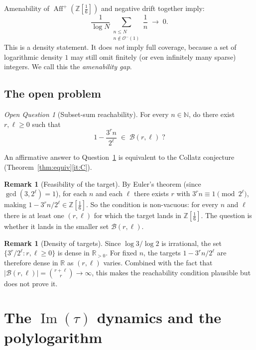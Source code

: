 \documentclass[12pt, a4paper]{amsart}
\theoremstyle{plain}
\theoremstyle{definition}
\newtheorem{remark}[theorem]{Remark}
\theoremstyle{remark}
\newtheorem{question}[theorem]{Open Question}
\newcommand{\N}{\mathbb{N}}
\newcommand{\Z}{\mathbb{Z}}
\newcommand{\R}{\mathbb{R}}
\newcommand{\Zs}{\Z[\tfrac{1}{6}]}
\newcommand{\Aff}{\operatorname{Aff}}
\begin{document}
Amenability of $\Aff^+(\Zs)$ and negative drift together imply:
\[
  \frac{1}{\log N}\sum_{\substack{n\leq N \\ n\notin\mathcal{O}^-(1)}}
  \frac{1}{n} \;\longrightarrow\; 0.
\]
This is a density statement.  It does \emph{not} imply full coverage,
because a set of logarithmic density $1$ may still omit finitely (or
even infinitely many sparse) integers.  We call this the
\emph{amenability gap}.

\subsection{The open problem}

\begin{question}[Subset-sum reachability]
  \label{q:reachability}
  For every $n\in\N$, do there exist $r,\ell\geq 0$ such that
  \[
    1 - \frac{3^r n}{2^\ell} \;\in\; \mathcal{B}(r,\ell)\;?
  \]
\end{question}

An affirmative answer to Question~\ref{q:reachability} is equivalent
to the Collatz conjecture (Theorem~\ref{thm:equiv}\ref{it:C}).

\begin{remark}[Feasibility of the target]
  By Euler's theorem (since $\gcd(3,2^\ell)=1$), for each $n$ and each
  $\ell$ there exists $r$ with $3^r n \equiv 1\pmod{2^\ell}$, making
  $1-3^r n/2^\ell\in\Zs$.  So the condition is non-vacuous: for every
  $n$ and $\ell$ there is at least one $(r,\ell)$ for which the target
  lands in $\Zs$.  The question is whether it lands in the smaller set
  $\mathcal{B}(r,\ell)$.
\end{remark}

\begin{remark}[Density of targets]
  Since $\log 3/\log 2$ is irrational, the set
  $\{3^r/2^\ell : r,\ell\geq 0\}$ is dense in $\R_{>0}$.  For fixed
  $n$, the targets $1-3^r n/2^\ell$ are therefore dense in $\R$ as
  $(r,\ell)$ varies.  Combined with the fact that
  $|\mathcal{B}(r,\ell)|=\binom{r+\ell}{r}\to\infty$, this makes the
  reachability condition plausible but does not prove it.
\end{remark}

\section{The $\operatorname{Im}(\tau)$ dynamics and the polylogarithm}
\label{sec:tau}
\end{document}
